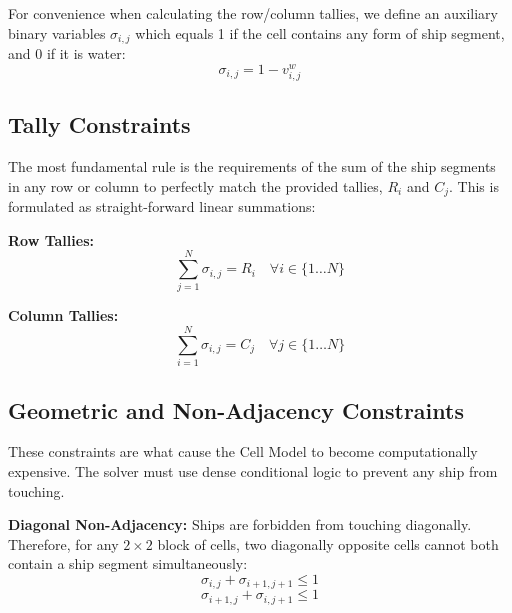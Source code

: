 For convenience when calculating the row/column tallies, we define an auxiliary binary variables $\sigma_{i,j}$ which equals 1 if the cell contains any form of ship segment, and 0 if it is water:
\begin{equation}
    \sigma_{i,j} = 1 - v_{i,j}^w
\end{equation}

\subsection{Tally Constraints}\label{subsec:tally-constraints}

The most fundamental rule is the requirements of the sum of the ship segments in any row or column to perfectly match the provided tallies, $R_i$ and $C_j$. This is formulated as straight-forward linear summations:

\textbf{Row Tallies:}
\begin{equation}
    \sum_{j=1}^{N} \sigma_{i,j} = R_i \quad \forall i \in \{1 \dots N\}
\end{equation}

\textbf{Column Tallies:}
\begin{equation}
    \sum_{i=1}^{N} \sigma_{i,j} = C_j \quad \forall j \in \{1 \dots N\}
\end{equation}

\subsection{Geometric and Non-Adjacency Constraints}\label{subsec:geo-and-non-adj-constraints}

These constraints are what cause the Cell Model to become computationally expensive. The solver must use dense conditional logic to prevent any ship from touching.

\textbf{Diagonal Non-Adjacency:}
Ships are forbidden from touching diagonally. Therefore, for any $2 \times 2$ block of cells, two diagonally opposite cells cannot both contain a ship segment simultaneously:
\begin{equation}
    \sigma_{i,j} + \sigma_{i+1, j+1} \leq 1 
\end{equation}
\begin{equation}
    \sigma_{i+1, j} + \sigma_{i, j+1} \leq 1
\end{equation}

